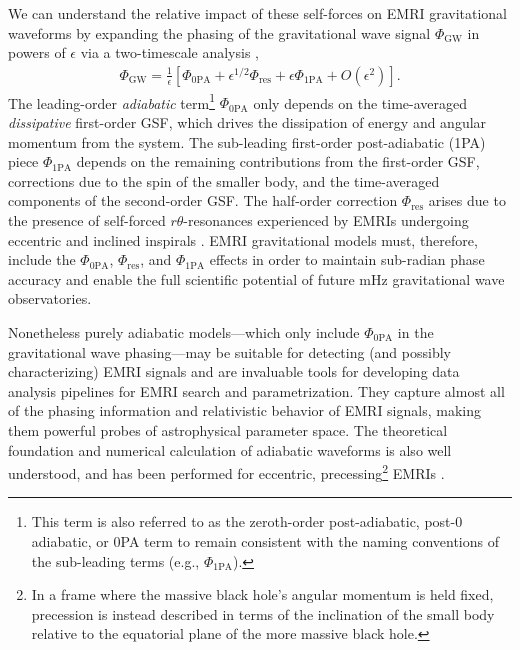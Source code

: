 \documentclass[%
 reprint,
 nofootinbib,
 amsmath,amssymb,
 aps,
 prd,
]{revtex4-2}
\begin{document}
We can understand the relative impact of these self-forces on EMRI gravitational waveforms by expanding the phasing of the gravitational wave signal $\Phi_\mathrm{GW}$ in powers of $\epsilon$ via a two-timescale analysis \cite{HindFlan08},
\begin{align} \label{eqn:twotimescale}
\Phi_\mathrm{GW} = \frac{1}{\epsilon} \left[ \Phi_\mathrm{0PA} + \epsilon^{1/2} \Phi_\mathrm{res} + \epsilon \Phi_\mathrm{1PA} + O(\epsilon^2)\right].
\end{align}
The leading-order \emph{adiabatic} term\footnote{This term is also referred to as the zeroth-order post-adiabatic, post-0 adiabatic, or 0PA term to remain consistent with the naming conventions of the sub-leading terms (e.g., $\Phi_\mathrm{1PA}$).} $\Phi_\mathrm{0PA}$ only depends on the time-averaged \emph{dissipative} first-order GSF, which drives the dissipation of energy and angular momentum from the system. The sub-leading first-order post-adiabatic (1PA) piece $\Phi_\mathrm{1PA}$ depends on the remaining contributions from the first-order GSF, corrections due to the spin of the smaller body, and the time-averaged components of the second-order GSF. The half-order correction $\Phi_\mathrm{res}$ arises due to the presence of self-forced $r\theta$-resonances experienced by EMRIs undergoing eccentric and inclined inspirals \cite{FlanHind12}. EMRI gravitational models must, therefore, include the $\Phi_\mathrm{0PA}$, $\Phi_\mathrm{res}$, and $\Phi_\mathrm{1PA}$ effects in order to maintain sub-radian phase accuracy and enable the full scientific potential of future mHz gravitational wave observatories. 

Nonetheless purely adiabatic models---which only include $\Phi_\mathrm{0PA}$ in the gravitational wave phasing---may be suitable for detecting (and possibly characterizing) EMRI signals \cite{GairJone06} and are invaluable tools for developing data analysis pipelines for EMRI search and parametrization. They capture almost all of the phasing information and relativistic behavior of EMRI signals, making them powerful probes of astrophysical parameter space. The theoretical foundation and numerical calculation of adiabatic waveforms is also well understood, and has been performed for eccentric, precessing\footnote{In a frame where the massive black hole's angular momentum is held fixed, precession is instead described in terms of the inclination of the small body relative to the equatorial plane of the more massive black hole.} EMRIs \cite{HughETC21}.
\end{document}
